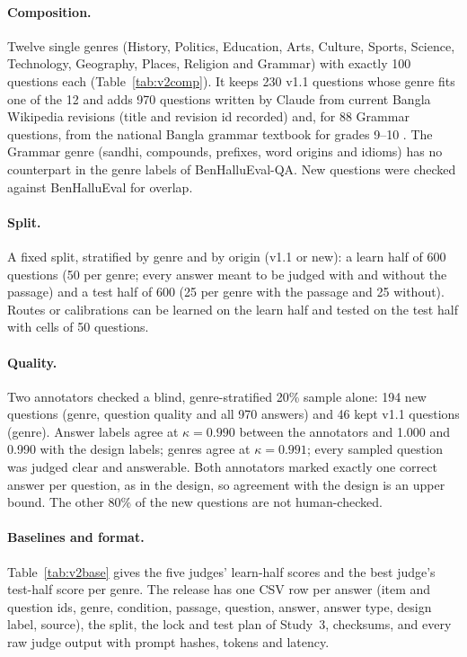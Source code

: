 \documentclass[11pt]{article}
\begin{document}
\paragraph{Composition.} Twelve single genres (History, Politics, Education, Arts, Culture, Sports, Science,
Technology, Geography, Places, Religion and Grammar) with exactly 100 questions each (Table~\ref{tab:v2comp}). It keeps
230 v1.1 questions whose genre fits one of the 12 and adds 970 questions written by Claude from current Bangla
Wikipedia revisions (title and revision id recorded) and, for 88 Grammar questions, from the national Bangla grammar
textbook for grades 9--10 \citep{nctb2021grammar}. The Grammar genre (sandhi, compounds, prefixes, word origins and
idioms) has no counterpart in the genre labels of BenHalluEval-QA. New questions were checked against BenHalluEval
for overlap.

\paragraph{Split.} A fixed split, stratified by genre and by origin (v1.1 or new): a learn half of 600 questions (50
per genre; every answer meant to be judged with and without the passage) and a test half of 600 (25 per genre with the
passage and 25 without). Routes or calibrations can be learned on the learn half and tested on the test half with
cells of 50 questions.

\paragraph{Quality.} Two annotators checked a blind, genre-stratified 20\% sample alone: 194 new questions (genre,
question quality and all 970 answers) and 46 kept v1.1 questions (genre). Answer labels agree at $\kappa=0.990$
between the annotators and 1.000 and 0.990 with the design labels; genres agree at $\kappa=0.991$; every sampled
question was judged clear and answerable. Both annotators marked exactly one correct answer per question, as in the
design, so agreement with the design is an upper bound. The other 80\% of the new questions are not human-checked.

\paragraph{Baselines and format.} Table~\ref{tab:v2base} gives the five judges' learn-half scores and the best judge's
test-half score per genre. The release has one CSV row per answer (item and question ids, genre, condition, passage,
question, answer, answer type, design label, source), the split, the lock and test plan of Study~3, checksums, and
every raw judge output with prompt hashes, tokens and latency.
\end{document}

